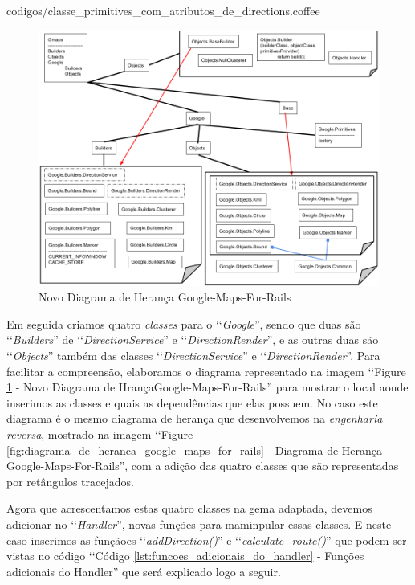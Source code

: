 
{codigos/classe_primitives_com_atributos_de_directions.coffee}

\begin{figure}[ht]
  \includegraphics[scale=0.48]{images/novo_diagrama_de_heranca_google_maps_for_rails.png}
  \caption{Novo Diagrama de Herança Google-Maps-For-Rails}
  \label{fig:novo_diagrama_de_heranca_google_maps_for_rails}
\end{figure}

Em seguida criamos quatro \emph{classes} para o ‘‘\emph{Google}'', sendo que duas são ‘‘\emph{Builders}'' de 
‘‘\emph{DirectionService}'' e ‘‘\emph{DirectionRender}'', e as outras duas são ‘‘\emph{Objects}'' também das 
classes ‘‘\emph{DirectionService}'' e ‘‘\emph{DirectionRender}''. Para facilitar a compreensão, elaboramos o 
diagrama representado na imagem ‘‘Figure \ref{fig:novo_diagrama_de_heranca_google_maps_for_rails} - Novo 
Diagrama de HrançaGoogle-Maps-For-Rails'' para mostrar o local aonde inserimos as classes e quais as 
dependências que elas possuem. No caso este diagrama é o mesmo diagrama de herança que desenvolvemos na 
\emph{engenharia reversa}, mostrado na imagem ‘‘Figure \ref{fig:diagrama_de_heranca_google_maps_for_rails} - 
Diagrama de Herança Google-Maps-For-Rails'', com a adição das quatro classes que são representadas 
por retângulos tracejados.

Agora que acrescentamos estas quatro classes na gema adaptada, devemos adicionar no ‘‘\emph{Handler}'', 
novas funções para maminpular essas classes. E neste caso inserimos as funçãoes ‘‘\emph{addDirection()}'' e 
‘‘\emph{calculate\_route()}'' que podem ser vistas no código ‘‘Código 
\ref{lst:funcoes_adicionais_do_handler} - Funções adicionais do Handler'' que será explicado logo a seguir.

